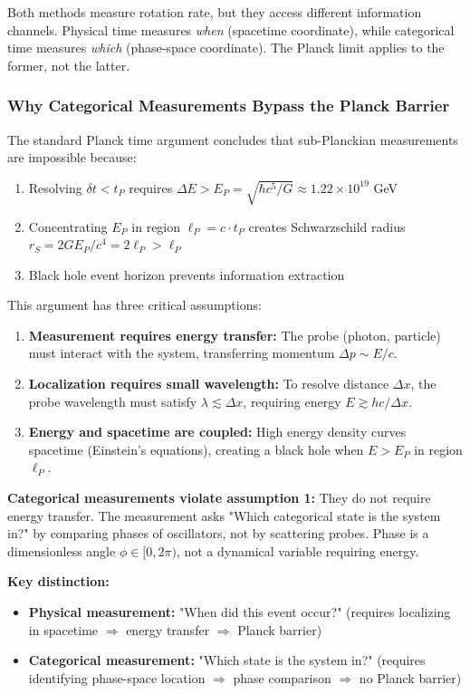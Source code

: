 \documentclass[twocolumn,10pt]{article}
\theoremstyle{remark}
\begin{document}
Both methods measure rotation rate, but they access different information channels. Physical time measures \textit{when} (spacetime coordinate), while categorical time measures \textit{which} (phase-space coordinate). The Planck limit applies to the former, not the latter.

\subsubsection{Why Categorical Measurements Bypass the Planck Barrier}

The standard Planck time argument concludes that sub-Planckian measurements are impossible because:
\begin{enumerate}
    \item Resolving $\delta t < t_P$ requires $\Delta E > E_P = \sqrt{\hbar c^5/G} \approx 1.22 \times 10^{19}$ GeV
    \item Concentrating $E_P$ in region $\ell_P = c \cdot t_P$ creates Schwarzschild radius $r_S = 2GE_P/c^4 = 2\ell_P > \ell_P$
    \item Black hole event horizon prevents information extraction
\end{enumerate}

This argument has three critical assumptions:
\begin{enumerate}
    \item \textbf{Measurement requires energy transfer:} The probe (photon, particle) must interact with the system, transferring momentum $\Delta p \sim E/c$.

    \item \textbf{Localization requires small wavelength:} To resolve distance $\Delta x$, the probe wavelength must satisfy $\lambda \lesssim \Delta x$, requiring energy $E \gtrsim hc/\Delta x$.

    \item \textbf{Energy and spacetime are coupled:} High energy density curves spacetime (Einstein's equations), creating a black hole when $E > E_P$ in region $\ell_P$.
\end{enumerate}

\textbf{Categorical measurements violate assumption 1:} They do not require energy transfer. The measurement asks "Which categorical state is the system in?" by comparing phases of oscillators, not by scattering probes. Phase is a dimensionless angle $\phi \in [0, 2\pi)$, not a dynamical variable requiring energy.

\textbf{Key distinction:}
\begin{itemize}
    \item \textbf{Physical measurement:} "When did this event occur?" (requires localizing in spacetime $\Rightarrow$ energy transfer $\Rightarrow$ Planck barrier)

    \item \textbf{Categorical measurement:} "Which state is the system in?" (requires identifying phase-space location $\Rightarrow$ phase comparison $\Rightarrow$ no Planck barrier)
\end{itemize}
\end{document}
